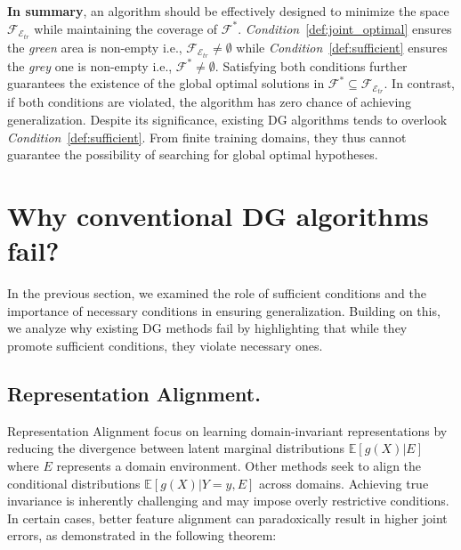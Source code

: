 \textbf{In summary}, an algorithm should be effectively designed to minimize the space $\mathcal{F}_{\mathcal{E}_{tr}}$ while maintaining the coverage of $\mathcal{F}^{*}$. \textit{Condition}~\ref{def:joint_optimal} ensures the \textit{green} area is non-empty i.e., $\mathcal{F}_{\mathcal{E}_{tr}} \ne \emptyset$ while  \textit{Condition}~\ref{def:sufficient} ensures the \textit{grey} one is non-empty i.e., $\mathcal{F}^{*} \ne \emptyset$. Satisfying both conditions further guarantees the existence of the global optimal solutions in $\mathcal{F}^{*} \subseteq \mathcal{F}_{\mathcal{E}_{tr}}$. In contrast, if both conditions are violated, the algorithm has zero chance of achieving generalization. Despite its significance, existing DG algorithms tends to overlook \textit{Condition}~\ref{def:sufficient}. From finite training domains, they thus cannot guarantee the possibility of searching for global optimal hypotheses. 




\section{Why conventional DG algorithms fail?} 
 \label{sec:discussion_DG}

In the previous section, we examined the role of sufficient conditions and the importance of necessary conditions in ensuring generalization. Building on this, we analyze why existing DG methods fail by highlighting that while they promote sufficient conditions, they violate necessary ones.

\subsection{Representation Alignment.} 

Representation Alignment focus on learning domain-invariant representations by reducing the divergence between latent marginal distributions $\mathbb{E}[g(X) | E]$ where $E$ represents a domain environment. Other methods seek to align the conditional distributions $\mathbb{E}[g(X) | Y=y, E]$ across domains. Achieving true invariance is inherently challenging and may impose overly restrictive conditions. In certain cases, better feature alignment can paradoxically result in higher joint errors, as demonstrated in the following theorem:


